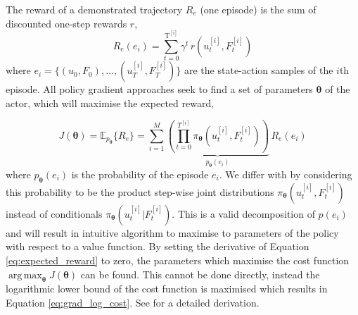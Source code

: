 \documentclass[final,5p,times,twocolumn]{elsarticle}
\newcommand{\Param}{\boldsymbol{\theta}}
\DeclareMathOperator*{\argmax}{arg\,max}
\begin{document}
The reward of a demonstrated trajectory $R_e$ (one episode) is the sum of discounted one-step rewards $r$,
\begin{equation}\label{eq:disc_return}
 R_e(e_i) = \sum_{t=0}^{\mathrm{T^{[i]}}} \gamma^t \, r(u^{[i]}_t,F^{[i]}_t)
\end{equation}
where $e_i = \{(u_0,F_0),\dots,(u_T^{[i]},F_T^{[i]}) \}$ are the state-action samples of the $i$th episode.
All policy gradient approaches seek to find a set of parameters $\Param$ of the actor,
which will maximise the expected reward,

\begin{equation}\label{eq:expected_reward}
 J(\Param) = \mathbb{E}_{p_{\Param}}\{R_e\} = \sum\limits_{i=1}^{M}
 \underbrace{\left( \prod_{t=0}^{T^{[i]}} \pi_{\Param}(u^{[i]}_t,F^{[i]}_t) \right)}_{p_{\Param}(e_i)} \, R_e(e_i) 
\end{equation}
where $p_{\Param}(e_i)$ is the probability of the episode $e_i$. We differ with \cite{p_search_surv_2011} by considering 
this probability to be the product step-wise joint distributions $\pi_{\Param}(u^{[i]}_t,F^{[i]}_t)$ instead of conditionals 
$\pi_{\Param}(u^{[i]}_t|F^{[i]}_t)$. This is a valid decomposition of $p(e_i)$ and will result in intuitive algorithm to maximise 
to parameters of the policy with respect to a value function.
By setting the derivative of Equation \ref{eq:expected_reward} to zero, the parameters which maximise the cost function $\argmax_{\Param} J(\Param)$
can be found. This cannot be done directly, instead the logarithmic lower bound of the cost function is maximised which results in 
Equation \ref{eq:grad_log_cost}. See \cite[p.50]{p_search_surv_2011} for a detailed derivation. 
\end{document}

